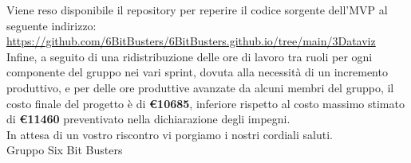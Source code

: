         

        \noindent Viene reso disponibile il repository per reperire il codice sorgente dell'MVP al seguente indirizzo: 
        \url{https://github.com/6BitBusters/6BitBusters.github.io/tree/main/3Dataviz}\\

        \noindent Infine, a seguito di una ridistribuzione delle ore di lavoro tra ruoli per ogni componente del gruppo nei vari sprint, dovuta alla necessità di un incremento produttivo, e per delle ore produttive avanzate da alcuni membri del gruppo, il costo finale del progetto è di \textbf{\euro 10685}, inferiore rispetto al
        costo massimo stimato di \textbf{\euro 11460} preventivato nella dichiarazione degli impegni.\\
	
	\noindent In attesa di un vostro riscontro vi porgiamo i nostri cordiali saluti.\\
        Gruppo Six Bit Busters